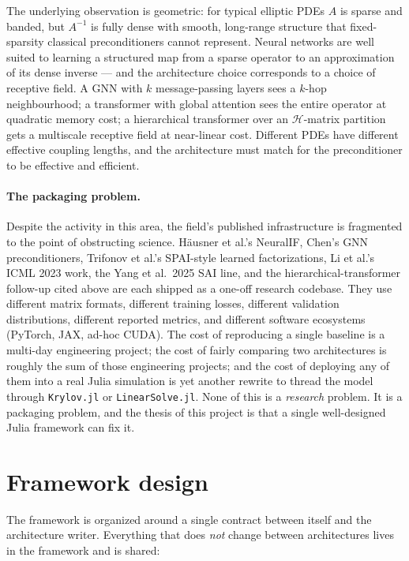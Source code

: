 \documentclass[11pt]{article}
\newcommand{\code}[1]{\texttt{\small #1}}
\begin{document}
The underlying observation is geometric: for typical elliptic PDEs $A$ is sparse and banded, but $A^{-1}$ is fully dense with smooth, long-range structure that fixed-sparsity classical preconditioners cannot represent. Neural networks are well suited to learning a structured map from a sparse operator to an approximation of its dense inverse --- and the architecture choice corresponds to a choice of receptive field. A GNN with $k$ message-passing layers sees a $k$-hop neighbourhood; a transformer with global attention sees the entire operator at quadratic memory cost; a hierarchical transformer over an $\mathcal H$-matrix partition gets a multiscale receptive field at near-linear cost. Different PDEs have different effective coupling lengths, and the architecture must match for the preconditioner to be effective and efficient.

\paragraph{The packaging problem.} Despite the activity in this area, the field's published infrastructure is fragmented to the point of obstructing science. H\"ausner et al.'s NeuralIF, Chen's GNN preconditioners, Trifonov et al.'s SPAI-style learned factorizations, Li et al.'s ICML 2023 work, the Yang et al.\ 2025 SAI line, and the hierarchical-transformer follow-up cited above are each shipped as a one-off research codebase. They use different matrix formats, different training losses, different validation distributions, different reported metrics, and different software ecosystems (PyTorch, JAX, ad-hoc CUDA). The cost of reproducing a single baseline is a multi-day engineering project; the cost of fairly comparing two architectures is roughly the sum of those engineering projects; and the cost of deploying any of them into a real Julia simulation is yet another rewrite to thread the model through \code{Krylov.jl} or \code{LinearSolve.jl}. None of this is a \emph{research} problem. It is a packaging problem, and the thesis of this project is that a single well-designed Julia framework can fix it.

\section{Framework design}

The framework is organized around a single contract between itself and the architecture writer. Everything that does \emph{not} change between architectures lives in the framework and is shared:
\end{document}
